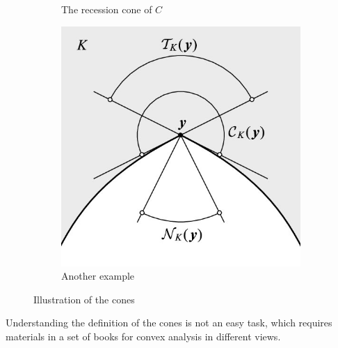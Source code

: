 \documentclass{beamerswitch}
\begin{document}
\begin{figure}[h!]
\begin{subfigure}[b]{0.3\textwidth}
        \caption{The recession cone of \(C\)}
        \label{fig:recession-cone}
    \end{subfigure}
    \begin{subfigure}[b]{0.4\textwidth}
        \centering
        \includegraphics[width=1\linewidth]{figs/Contingent-tangent-and-normal-cone-on-a-non-convex-set-K-R-2_Q640.jpeg}
        \caption{Another example}
        \label{fig:another-cone}
    \end{subfigure}
    \caption{Illustration of the cones}
    \label{fig:cone-illustration}
\end{figure}

Understanding the definition of the cones is not an easy task, which requires materials in a set of books for convex analysis in different views.
\end{document}
